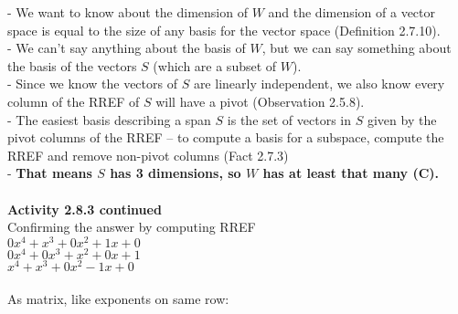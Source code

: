 \documentclass{article}
\begin{document}
- We want to know about the dimension of $W$ and the dimension of a vector space is equal to the size of any basis for the vector space (Definition 2.7.10).\\
- We can't say anything about the basis of $W$, but we can say something about the basis of the vectors $S$ (which are a subset of $W$).\\
- Since we know the vectors of $S$ are linearly independent, we also know every column of the RREF of $S$ will have a pivot (Observation 2.5.8).\\
- The easiest basis describing a span $S$ is the set of vectors in $S$ given by the pivot columns of the RREF -- to compute a basis for a subspace, compute the RREF and remove non-pivot columns (Fact 2.7.3) \\ 
- \textbf{That means $S$ has 3 dimensions, so $W$ has at least that many (C).}\\
\\
\newpage
\noindent \textbf{Activity 2.8.3 continued} \\
Confirming the answer by computing RREF\\
$0x^{4} + x^{3} + 0x^{2} + 1x + 0$\\
$0x^{4} + 0x^{3} + x^{2} + 0x + 1$\\
$x^{4} + x^{3} + 0x^{2} - 1x + 0$\\
\\
As matrix, like exponents on same row:\\
\end{document}
